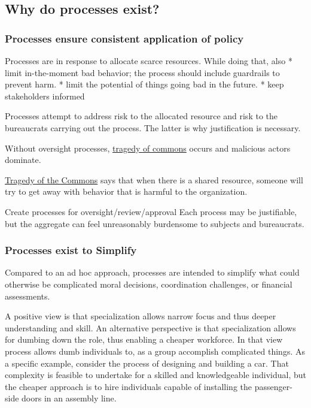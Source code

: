 \subsection{Why do processes exist?}


\subsubsection{Processes ensure consistent application of policy}

Processes are in response to allocate scarce resources. While doing that, also 
* limit in-the-moment bad behavior; the process should include guardrails to prevent harm. 
* limit the potential of things going bad in the future. 
* keep stakeholders informed

Processes attempt to address risk to the allocated resource and risk to the bureaucrats carrying out the process. The latter is why justification is necessary. 

    
Without oversight processes, \href{https://en.wikipedia.org/wiki/Tragedy_of_the_commons}{tragedy of commons} occurs and malicious actors dominate.

\href{https://en.wikipedia.org/wiki/Tragedy_of_the_commons}{Tragedy of the Commons} says that when there is a shared resource, someone will try to get away with behavior that is harmful to the organization.

Create processes for oversight/review/approval
Each process may be justifiable, but the aggregate can feel unreasonably burdensome to subjects and bureaucrats.





\subsubsection{Processes exist to Simplify}
Compared to an ad hoc approach, processes are intended to simplify what could otherwise be complicated moral decisions, coordination challenges, or financial assessments. %



A positive view is that specialization allows narrow focus and thus deeper understanding and skill. An alternative perspective is that specialization allows for dumbing down the role, thus enabling a cheaper workforce. In that view process allows dumb individuals to, as a group accomplish complicated things.  As a specific example, consider the process of designing and building a car. That complexity is feasible to undertake for a skilled and knowledgeable individual, but the cheaper approach is to hire individuals capable of installing the passenger-side doors in an assembly line.

